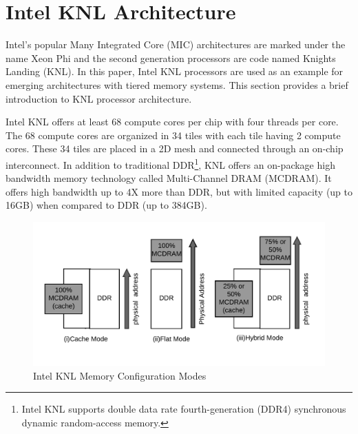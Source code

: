 \section{Intel KNL Architecture}
\label{src:knl}

Intel's popular Many Integrated Core (MIC) architectures are marked
under the name Xeon Phi and the second generation processors are
code
named Knights Landing (KNL). In
this paper, Intel KNL processors are used as an
example for emerging architectures with tiered memory systems. This
section provides a brief introduction to KNL
processor architecture.

Intel KNL offers at least 68 compute cores per chip with four
threads per core. %
The 68 compute cores are organized
in 34 tiles with each tile having 2 compute cores.%
These 34 tiles are placed in a 2D mesh and connected through
an on-chip interconnect. In addition to traditional
DDR\footnote{Intel KNL supports double data rate fourth-generation
(DDR4)
synchronous dynamic random-access memory.}, KNL offers an on-package
high bandwidth memory
technology called Multi-Channel DRAM (MCDRAM). It offers high
bandwidth up to 4X more than DDR, but with limited capacity (up to
16GB) when compared to DDR (up to 384GB).

\begin{figure}[!h]
    \vspace{-35pt}
    \hspace*{5mm}
    \includegraphics[scale=0.20]{image/mem-mode.png}
    \vspace{-25pt}
    \caption{Intel KNL Memory Configuration Modes}
    \vspace{-25pt}
    \label{fig:memmode}
\end{figure}

